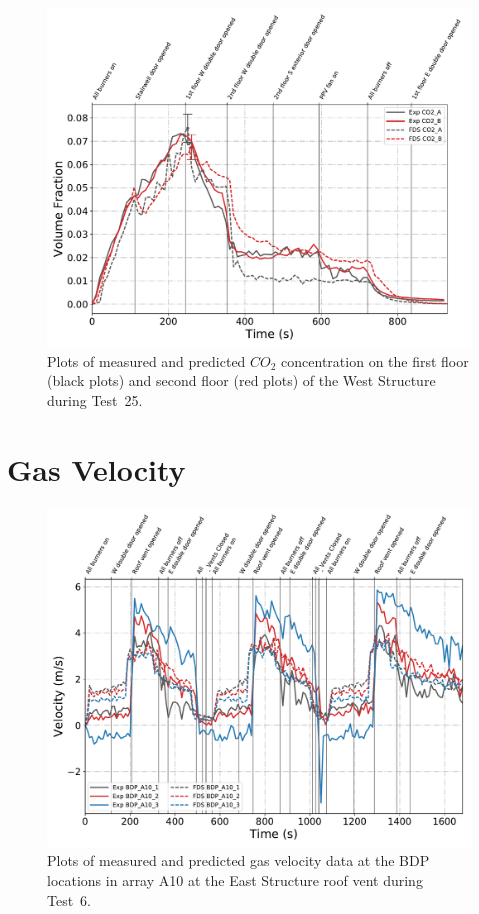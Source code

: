\begin{figure}[!h]
	\centering
	\includegraphics[width=\columnwidth]{Figures/Plots/Validation/Gas_Concentration/Test_25_CO2}
	\caption[Plots of measured and predicted $CO_2$ concentration during Test~25.]{Plots of measured and predicted $CO_2$ concentration on the first floor (black plots) and second floor (red plots) of the West Structure during Test~25.}
	\label{fig:Test25_CO2}
\end{figure}

\clearpage
\section{Gas Velocity}
\begin{figure}[!h]
	\centering
	\includegraphics[width=\columnwidth]{Figures/Plots/Validation/Velocity/Test_6_BDP_A10}
	\caption[Plots of measured and predicted gas velocity data at BDP locations in A10 during Test~6.]{Plots of measured and predicted gas velocity data at the BDP locations in array A10 at the East Structure roof vent during Test~6.}
	\label{fig:Test6_BDPs}
\end{figure}

